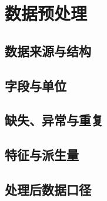 \section{数据预处理}

\subsection{数据来源与结构}

\subsection{字段与单位}

\subsection{缺失、异常与重复}

\subsection{特征与派生量}

\subsection{处理后数据口径}
